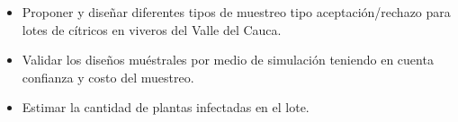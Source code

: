 \begin{itemize}
\item Proponer y dise\~{n}ar diferentes tipos de muestreo tipo aceptaci\'{o}n/rechazo para lotes de c\'{i}tricos en viveros del Valle del Cauca.
\item Validar los dise\~{n}os mu\'{e}strales por medio de simulaci\'{o}n teniendo en cuenta confianza y costo del muestreo.
\item Estimar la cantidad de plantas infectadas en el lote.

\end{itemize}

